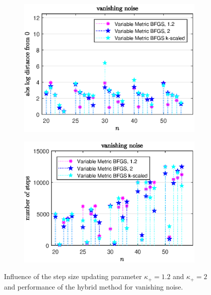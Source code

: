 \vspace{-1.5em}

\begin{figure}[H]
	\begin{subfigure}{0.49\textwidth}
		\includegraphics[width=\textwidth]{Pictures/Plots/vanishing_noise_compb.eps}%
	\end{subfigure}
	\begin{subfigure}{0.49\textwidth}
		\includegraphics[width=\textwidth]{Pictures/Plots/steps_vanishing_noise_compb.eps}%
	\end{subfigure}
	\caption{Influence of the step size updating parameter \(\kappa_+ = 1.2\) and \(\kappa_+ =2 \) and performance of the hybrid method for vanishing noise.}%
	\label{fig_van_noise_comp_large}%
\end{figure}

